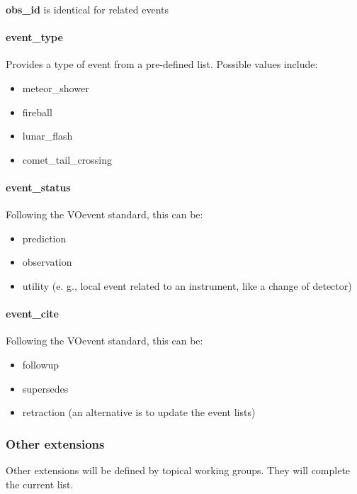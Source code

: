 \documentclass[11pt,a4paper]{ivoa}
\begin{document}
\textbf{obs\_id} is identical for related events

\paragraph{event\_type}

Provides a type of event from a pre-defined list. Possible values include:

\begin{itemize}
\item meteor\_shower
\item fireball
\item lunar\_flash
\item comet\_tail\_crossing
\end{itemize}

\paragraph{event\_status}

Following the VOevent standard, this can be:

\begin{itemize}
\item prediction
\item observation
\item utility (e. g., local event related to an instrument, like a change of detector)
\end{itemize}

\paragraph{event\_cite}

Following the VOevent standard, this can be:

\begin{itemize}
\item followup
\item supersedes
\item retraction (an alternative is to update the event lists)
\end{itemize}


\subsubsection{Other extensions}

Other extensions will be defined by topical working groups. They will complete the current list.
\end{document}

